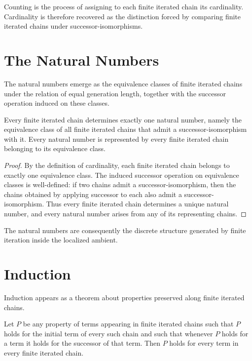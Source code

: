 \documentclass[12pt,anyside]{book}
\begin{document}
Counting is the process of assigning to each finite iterated chain its cardinality. Cardinality is therefore recovered as the distinction forced by comparing finite iterated chains under successor-isomorphisms.

\section{The Natural Numbers}
The natural numbers emerge as the equivalence classes of finite iterated chains under the relation of equal generation length, together with the successor operation induced on these classes.

\begin{theorem}
Every finite iterated chain determines exactly one natural number, namely the equivalence class of all finite iterated chains that admit a successor-isomorphism with it. Every natural number is represented by every finite iterated chain belonging to its equivalence class.
\end{theorem}

\begin{proof}
By the definition of cardinality, each finite iterated chain belongs to exactly one equivalence class. The induced successor operation on equivalence classes is well-defined: if two chains admit a successor-isomorphism, then the chains obtained by applying successor to each also admit a successor-isomorphism. Thus every finite iterated chain determines a unique natural number, and every natural number arises from any of its representing chains.
\end{proof}

The natural numbers are consequently the discrete structure generated by finite iteration inside the localized ambient.

\section{Induction}
Induction appears as a theorem about properties preserved along finite iterated chains.

\begin{theorem}[Induction]
Let $P$ be any property of terms appearing in finite iterated chains such that $P$ holds for the initial term of every such chain and such that whenever $P$ holds for a term it holds for the successor of that term. Then $P$ holds for every term in every finite iterated chain.
\end{theorem}
\end{document}
